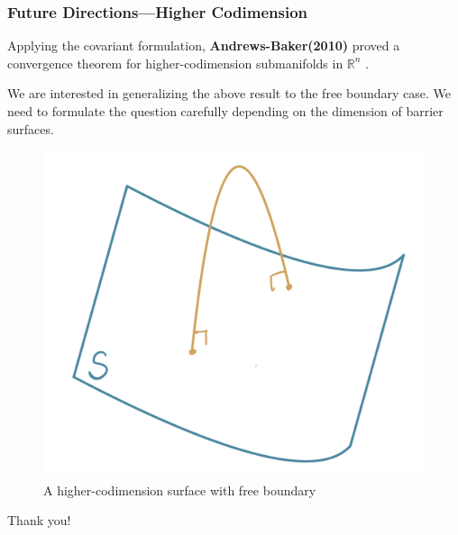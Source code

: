 \documentclass[pdf]{beamer}
\newcommand{\R}{\mathbb{R}}
\begin{document}
    \begin{frame}
        \frametitle{Future Directions---Higher Codimension}
        
        Applying the covariant formulation, \textbf{Andrews-Baker(2010)} proved a convergence theorem for higher-codimension submanifolds in $\R^n$ .

        We are interested in generalizing the above result to the free boundary case. We need to formulate the question carefully depending on the dimension of barrier surfaces.

        \begin{figure}[h]
            \centering
            \includegraphics[scale=0.12]{HiCo.png}
            \caption{A higher-codimension surface with free boundary}
        \end{figure}
    \end{frame}

    \begin{frame}
        \centering \Large
        Thank you!
    \end{frame}
\end{document}
